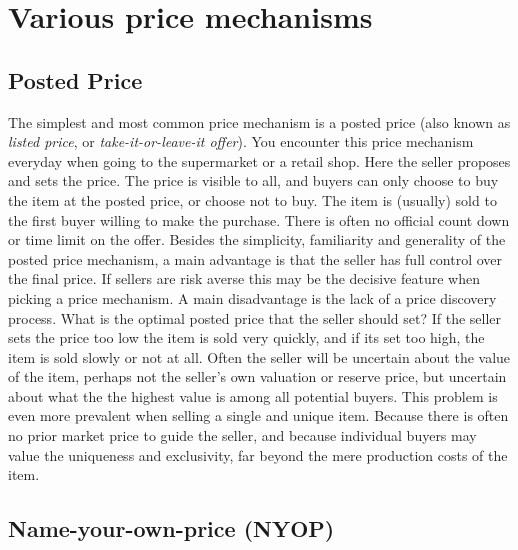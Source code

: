 \documentclass[a4paper,12pt]{article}
\begin{document}
	\section{Various price mechanisms}

	\subsection{Posted Price}
	The simplest and most common price mechanism is a posted price (also known as {\it listed price}, or {\it take-it-or-leave-it offer}). You encounter this price mechanism everyday when going to the supermarket or a retail shop. Here the seller proposes and sets the price. The price is visible to all, and buyers can only choose to buy the item at the posted price, or choose not to buy. The item is (usually) sold to the first buyer willing to make the purchase. There is often no official count down or time limit on the offer. Besides the simplicity, familiarity and generality of the posted price mechanism, a main advantage is that the seller has full control over the final price. If sellers are risk averse this may be the decisive feature when picking a price mechanism. A main disadvantage is the lack of a price discovery process. What is the optimal posted price that the seller should set? If the seller sets the price too low the item is sold very quickly, and if its set too high, the item is sold slowly or not at all. Often the seller will be uncertain about the value of the item, perhaps not the seller's own valuation or reserve price, but uncertain about what the the highest value is among all potential buyers. This problem is even more prevalent when selling a single and unique item. Because there is often no prior market price to guide the seller, and because individual buyers may value the uniqueness and exclusivity, far beyond the mere production costs of the item.

	\subsection{Name-your-own-price (NYOP)}
\end{document}
